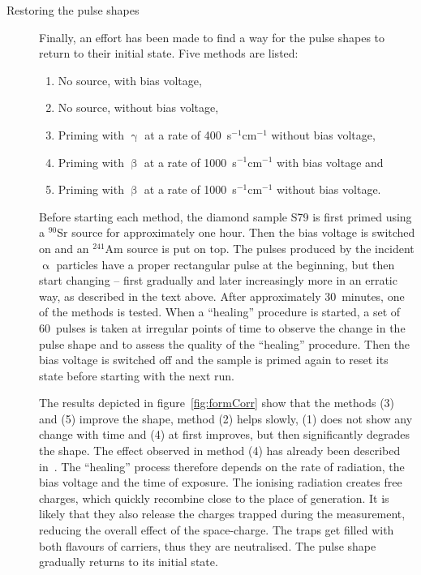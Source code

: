 \begin{description}
\item[Restoring the pulse shapes] Finally, an effort has been made to find a way for the pulse shapes to return to their initial state. Five methods are listed: 
\begin{enumerate}[itemsep=0.1\baselineskip]
\item No source, with bias voltage, 
\item No source, without bias voltage, 
\item Priming with $\upgamma$ at a rate of 400~s$^{-1}$cm$^{-1}$ without bias voltage, 
\item Priming with $\upbeta$ at a rate of 1000~s$^{-1}$cm$^{-1}$ with bias voltage and 
\item Priming with $\upbeta$ at a rate of 1000~s$^{-1}$cm$^{-1}$ without bias voltage. 
\end{enumerate}
Before starting each method, the diamond sample S79 is first primed using a $^{90}$Sr source for approximately one hour. Then the bias voltage is switched on and an $^{241}$Am source is put on top. The pulses produced by the incident $\upalpha$ particles have a proper rectangular pulse at the beginning, but then start changing -- first gradually and later increasingly more in an erratic way, as described in the text above. After approximately 30~minutes, one of the methods is tested. When a ``healing'' procedure is started, a set of 60~pulses is taken at irregular points of time to observe the change in the pulse shape and to assess the quality of the ``healing'' procedure. Then the bias voltage is switched off and the sample is primed again to reset its state before starting with the next run. 

The results depicted in figure~\ref{fig:formCorr} show that the methods (3) and (5) improve the shape, method (2) helps slowly, (1) does not show any change with time and (4) at first improves, but then significantly degrades the shape. The effect observed in method (4) has already been described in~\cite{Kramberger:2013wva}. The ``healing'' process therefore depends on the rate of radiation, the bias voltage and the time of exposure. The ionising radiation creates free charges, which quickly recombine close to the place of generation. It is likely that they also release the charges trapped during the measurement, reducing the overall effect of the space-charge. The traps get filled with both flavours of carriers, thus they are neutralised. The pulse shape gradually returns to its initial state.


\end{description}
